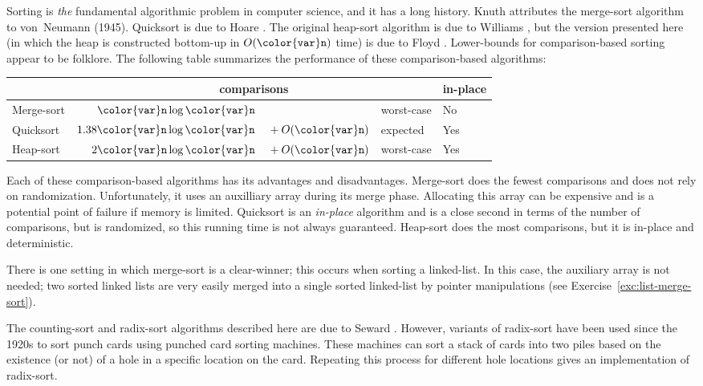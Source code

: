 \documentclass[10pt]{book}
\theoremstyle{plain}
\theoremstyle{definition}
\newcommand{\excref}[1]{Exercise~\ref{exc:#1}}
\begin{document}
Sorting is \emph{the} fundamental algorithmic problem in computer science,
and it has a long history.  Knuth \cite{k97v3} attributes the merge-sort
algorithm to von~Neumann (1945).  Quicksort is due to Hoare \cite{h61}.
The original heap-sort algorithm is due to Williams \cite{w64}, but the
version presented here (in which the heap is constructed bottom-up
in $O(\ensuremath{\mathtt{{\color{var}n}}})$ time) is due to Floyd \cite{f64}.  Lower-bounds for
comparison-based sorting appear to be folklore.  The following table
summarizes the performance of these comparison-based algorithms:

\begin{center}
  \begin{tabular}{|l|r@{}l@{ }l|l|} \hline
      & \multicolumn{3}{c|}{comparisons} & in-place  \\ \hline
    Merge-sort & $\ensuremath{\mathtt{{\color{var}n}}}\log \ensuremath{\mathtt{{\color{var}n}}}$ & &  worst-case & No  \\
    Quicksort & $1.38\ensuremath{\mathtt{{\color{var}n}}}\log \ensuremath{\mathtt{{\color{var}n}}}$ & ${}+ O(\ensuremath{\mathtt{{\color{var}n}}})$ & expected & Yes \\
    Heap-sort & $2\ensuremath{\mathtt{{\color{var}n}}}\log \ensuremath{\mathtt{{\color{var}n}}}$ & ${}+ O(\ensuremath{\mathtt{{\color{var}n}}})$ & worst-case & Yes \\ \hline
  \end{tabular}
\end{center}

Each of these comparison-based algorithms has its advantages and
disadvantages.  Merge-sort does the fewest comparisons and does not rely
on randomization.  Unfortunately, it uses an auxilliary array during its
merge phase.  Allocating this array can be expensive and is a potential
point of failure if memory is limited.  Quicksort is an \emph{in-place}
%
algorithm and is a close second in terms of the number of comparisons,
but is randomized, so this running time is not always guaranteed.
Heap-sort does the most comparisons, but it is in-place and deterministic.

There is one setting in which merge-sort is a clear-winner;  this
occurs when sorting a linked-list.  In this case, the auxiliary
array is not needed;  two sorted linked lists are very easily merged
into a single sorted linked-list by pointer manipulations (see
\excref{list-merge-sort}).

The counting-sort and radix-sort algorithms described here are due
to Seward \cite[Section~2.4.6]{s54}.  However, variants of radix-sort
have been used since the 1920s to sort punch cards using punched card
sorting machines.  These machines can sort a stack of cards into two
piles based on the existence (or not) of a hole in a specific location
on the card.  Repeating this process for different hole locations gives
an implementation of radix-sort.
\end{document}
